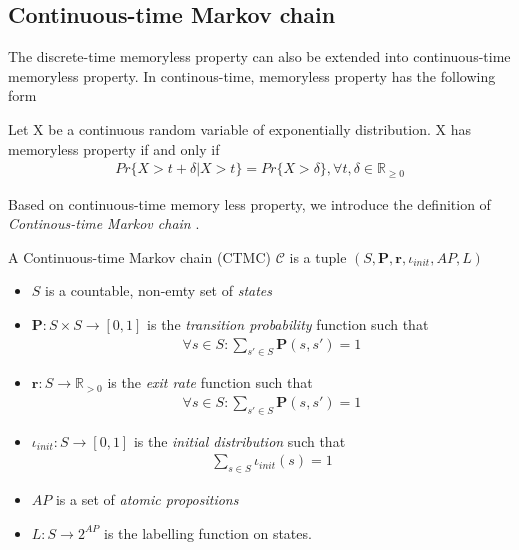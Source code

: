 \subsection{Continuous-time Markov chain}
The discrete-time memoryless property can also be extended into continuous-time memoryless property.
In continous-time, memoryless property has the following form
\begin{definition}
    Let X be a continuous random variable of exponentially distribution. X has memoryless property
    if and only if
    \begin{align*}
        Pr\{X > t + \delta | X > t\} = Pr\{X > \delta\}, \forall t,\delta \in \mathbb{R}_{\geq 0}
    \end{align*}
\end{definition}
Based on continuous-time memory less property, we introduce the definition of \textit{Continous-time
    Markov chain} \cite{katoen2013model}.
\begin{definition}
    A Continuous-time Markov chain (CTMC) $\mathcal{C}$ is a tuple $(S,\mathbf{P}, \mathbf{r}, \iota_{init}, AP, L)$
    \begin{itemize}
        \item $S$ is a countable, non-emty set of \textit{states}
        \item $\mathbf{P}:S\times S \rightarrow [0,1]$ is the \textit{transition probability}
              function such that
              \begin{align*}
                  \forall s \in S : \sum_{s'\in S}\mathbf{P}(s, s') = 1
              \end{align*}
        \item $\mathbf{r}:S \rightarrow \mathbb{R}_{>0}$ is the \textit{exit rate} function
              such that
              \begin{align*}
                  \forall s \in S : \sum_{s'\in S}\mathbf{P}(s, s') = 1
              \end{align*}
        \item $\iota_{init}: S \rightarrow [0,1]$ is the \textit{initial distribution} such that
              \begin{align*}
                  \sum_{s\in S}\iota_{init}(s) = 1
              \end{align*}
        \item $AP$ is a set of \textit{atomic propositions}
        \item $L: S \rightarrow 2^{AP}$ is the labelling function on states.
    \end{itemize}
\end{definition}

